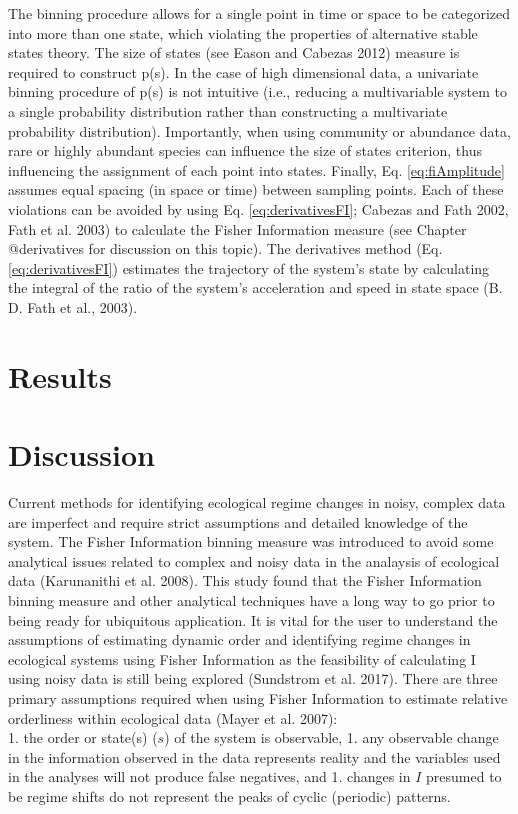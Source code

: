 \documentclass[12pt,twoside,openany]{reedthesis}
\begin{document}
The binning procedure allows for a single point in time or space to be
categorized into more than one state, which violating the properties of
alternative stable states theory. The size of states (see Eason and
Cabezas 2012) measure is required to construct p(s). In the case of high
dimensional data, a univariate binning procedure of p(s) is not
intuitive (i.e., reducing a multivariable system to a single probability
distribution rather than constructing a multivariate probability
distribution). Importantly, when using community or abundance data, rare
or highly abundant species can influence the size of states criterion,
thus influencing the assignment of each point into states. Finally, Eq.
\eqref{eq:fiAmplitude} assumes equal spacing (in space or time) between
sampling points. Each of these violations can be avoided by using Eq.
\eqref{eq:derivativesFI}; Cabezas and Fath 2002, Fath et al. 2003) to
calculate the Fisher Information measure (see Chapter @derivatives for
discussion on this topic). The derivatives method (Eq.
\eqref{eq:derivativesFI}) estimates the trajectory of the system's state
by calculating the integral of the ratio of the system's acceleration
and speed in state space (B. D. Fath et al., 2003).

\section{Results}\label{results-1}

\section{Discussion}\label{discussion-1}

Current methods for identifying ecological regime changes in noisy,
complex data are imperfect and require strict assumptions and detailed
knowledge of the system. The Fisher Information binning measure was
introduced to avoid some analytical issues related to complex and noisy
data in the analaysis of ecological data (Karunanithi et al. 2008). This
study found that the Fisher Information binning measure and other
analytical techniques have a long way to go prior to being ready for
ubiquitous application. It is vital for the user to understand the
assumptions of estimating dynamic order and identifying regime changes
in ecological systems using Fisher Information as the feasibility of
calculating I using noisy data is still being explored (Sundstrom et al.
2017). There are three primary assumptions required when using Fisher
Information to estimate relative orderliness within ecological data
(Mayer et al. 2007):\\
1. the order or state(s) (\(s\)) of the system is observable, 1. any
observable change in the information observed in the data represents
reality and the variables used in the analyses will not produce false
negatives, and 1. changes in \(I\) presumed to be regime shifts do not
represent the peaks of cyclic (periodic) patterns.
\end{document}
